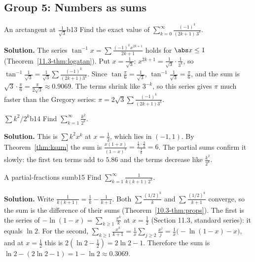 \documentclass[11pt]{article}
\begin{document}
\subsection*{Group 5: Numbers as sums}

\begin{exmp}{An arctangent at $\frac1{\sqrt3}$}{b13}
Find the exact value of $\displaystyle\sum_{k=0}^\infty\frac{(-1)^k}{(2k+1)\,3^k}$.

\textbf{Solution.} The series $\tan^{-1}x=\sum\frac{(-1)^kx^{2k+1}}{2k+1}$ holds for $\abs x\le1$ (Theorem~\ref{11.3-thm:logatan}). Put $x=\frac1{\sqrt3}$: $x^{2k+1}=\frac1{\sqrt3}\cdot\frac1{3^k}$, so $\tan^{-1}\frac1{\sqrt3}=\frac1{\sqrt3}\sum\frac{(-1)^k}{(2k+1)3^k}$. Since $\tan\frac\pi6=\frac1{\sqrt3}$, $\tan^{-1}\frac1{\sqrt3}=\frac\pi6$, and the sum is $\sqrt3\cdot\frac\pi6=\frac\pi{2\sqrt3}\approx0.9069$. The terms shrink like $3^{-k}$, so this series gives $\pi$ much faster than the Gregory series: $\pi=2\sqrt3\sum\frac{(-1)^k}{(2k+1)3^k}$.
\end{exmp}

\begin{exmp}{$\sum k^2/2^k$}{b14}
Find $\displaystyle\sum_{k=1}^\infty\frac{k^2}{2^k}$.

\textbf{Solution.} This is $\sum k^2x^k$ at $x=\frac12$, which lies in $(-1,1)$. By Theorem~\ref{thm:ksum} the sum is $\frac{x(1+x)}{(1-x)^3}=\frac{\frac12\cdot\frac32}{\frac18}=6$. The partial sums confirm it slowly: the first ten terms add to $5.86$ and the terms decrease like $\frac{k^2}{2^k}$.
\end{exmp}

\begin{exmp}{A partial-fractions sum}{b15}
Find $\displaystyle\sum_{k=1}^\infty\frac1{k(k+1)\,2^k}$.

\textbf{Solution.} Write $\frac1{k(k+1)}=\frac1k-\frac1{k+1}$. Both $\sum\frac{(1/2)^k}k$ and $\sum\frac{(1/2)^k}{k+1}$ converge, so the sum is the difference of their sums (Theorem~\ref{10.3-thm:props}). The first is the series of $-\ln(1-x)=\sum_{k\ge1}\frac{x^k}k$ at $x=\frac12$ (Section 11.3, standard series): it equals $\ln2$. For the second, $\sum_{k\ge1}\frac{x^k}{k+1}=\frac1x\sum_{j\ge2}\frac{x^j}j=\frac1x\bigl(-\ln(1-x)-x\bigr)$, and at $x=\frac12$ this is $2\left(\ln2-\frac12\right)=2\ln2-1$. Therefore the sum is $\ln2-(2\ln2-1)=1-\ln2\approx0.3069$.
\end{exmp}
\end{document}
